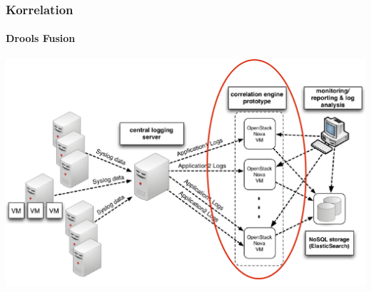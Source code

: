 \begin{frame}
\frametitle{Korrelation}
\framesubtitle{Drools Fusion}
\includegraphics[scale=0.25]{img/schema-correlat-03.png}
\end{frame}


